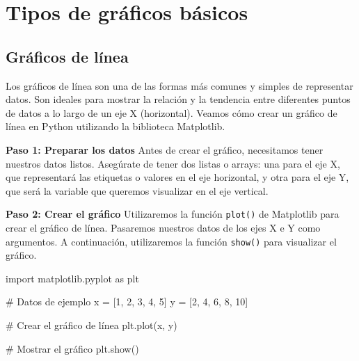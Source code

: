 \documentclass[
  a4paper,
]{article}
\newenvironment{Shaded}{}{}
\newcommand{\CommentTok}[1]{\textcolor[rgb]{0.42,0.45,0.49}{#1}}
\newcommand{\DecValTok}[1]{\textcolor[rgb]{0.00,0.36,0.77}{#1}}
\newcommand{\ImportTok}[1]{\textcolor[rgb]{0.01,0.18,0.38}{#1}}
\newcommand{\NormalTok}[1]{\textcolor[rgb]{0.14,0.16,0.18}{#1}}
\newcommand{\OperatorTok}[1]{\textcolor[rgb]{0.14,0.16,0.18}{#1}}
\begin{document}
\hypertarget{tipos-de-gruxe1ficos-buxe1sicos}{%
\section{Tipos de gráficos
básicos}\label{tipos-de-gruxe1ficos-buxe1sicos}}

\hypertarget{gruxe1ficos-de-luxednea}{%
\subsection{Gráficos de línea}\label{gruxe1ficos-de-luxednea}}

Los gráficos de línea son una de las formas más comunes y simples de
representar datos. Son ideales para mostrar la relación y la tendencia
entre diferentes puntos de datos a lo largo de un eje X (horizontal).
Veamos cómo crear un gráfico de línea en Python utilizando la biblioteca
Matplotlib.

\textbf{Paso 1: Preparar los datos} Antes de crear el gráfico,
necesitamos tener nuestros datos listos. Asegúrate de tener dos listas o
arrays: una para el eje X, que representará las etiquetas o valores en
el eje horizontal, y otra para el eje Y, que será la variable que
queremos visualizar en el eje vertical.

\textbf{Paso 2: Crear el gráfico} Utilizaremos la función
\texttt{plot()} de Matplotlib para crear el gráfico de línea. Pasaremos
nuestros datos de los ejes X e Y como argumentos. A continuación,
utilizaremos la función \texttt{show()} para visualizar el gráfico.

\begin{Shaded}
\begin{Highlighting}[]
\ImportTok{import}\NormalTok{ matplotlib.pyplot }\ImportTok{as}\NormalTok{ plt}

\CommentTok{\# Datos de ejemplo}
\NormalTok{x }\OperatorTok{=}\NormalTok{ [}\DecValTok{1}\NormalTok{, }\DecValTok{2}\NormalTok{, }\DecValTok{3}\NormalTok{, }\DecValTok{4}\NormalTok{, }\DecValTok{5}\NormalTok{]}
\NormalTok{y }\OperatorTok{=}\NormalTok{ [}\DecValTok{2}\NormalTok{, }\DecValTok{4}\NormalTok{, }\DecValTok{6}\NormalTok{, }\DecValTok{8}\NormalTok{, }\DecValTok{10}\NormalTok{]}

\CommentTok{\# Crear el gráfico de línea}
\NormalTok{plt.plot(x, y)}

\CommentTok{\# Mostrar el gráfico}
\NormalTok{plt.show()}
\end{Highlighting}
\end{Shaded}
\end{document}
